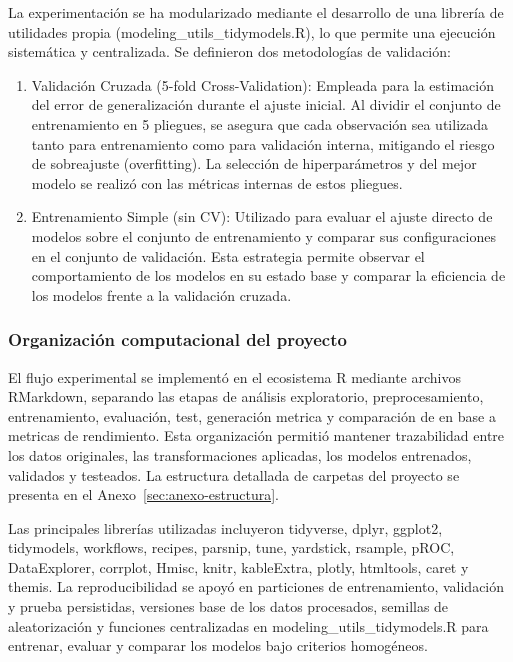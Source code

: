 La experimentación se ha modularizado mediante el desarrollo de una librería de
utilidades propia (modeling\_utils\_tidymodels.R), lo que permite una ejecución sistemática y centralizada. Se definieron dos metodologías de validación:

\begin{enumerate}
  \item Validación Cruzada (5-fold Cross-Validation): Empleada para la estimación
    del error de generalización durante el ajuste inicial. Al dividir el
    conjunto de entrenamiento en 5 pliegues, se asegura que cada observación sea
    utilizada tanto para entrenamiento como para validación interna, mitigando el
    riesgo de sobreajuste (overfitting). La selección de hiperparámetros y del
    mejor modelo se realizó con las métricas internas de estos pliegues.
  \item Entrenamiento Simple (sin CV): Utilizado para evaluar el ajuste directo de
    modelos sobre el conjunto de entrenamiento y comparar sus configuraciones en
    el conjunto de validación. Esta estrategia permite observar el comportamiento
    de los modelos en su estado base y comparar la eficiencia de los modelos
    frente a la validación cruzada.
\end{enumerate}

\subsubsection{Organización computacional del proyecto}

El flujo experimental se implementó en el ecosistema R mediante archivos
RMarkdown, separando las etapas de análisis exploratorio, preprocesamiento,
entrenamiento, evaluación, test, generación metrica y comparación de en base a metricas de rendimiento. Esta organización permitió
mantener trazabilidad entre los datos originales, las transformaciones aplicadas,
los modelos entrenados, validados y testeados. La estructura detallada de
carpetas del proyecto se presenta en el Anexo~\ref{sec:anexo-estructura}.

Las principales librerías utilizadas incluyeron tidyverse, dplyr, ggplot2,
tidymodels, workflows, recipes, parsnip, tune, yardstick, rsample, pROC,
DataExplorer, corrplot, Hmisc, knitr, kableExtra, plotly, htmltools, caret y themis. La
reproducibilidad se apoyó en particiones de entrenamiento, validación y prueba
persistidas, versiones base de los datos procesados, semillas de aleatorización
y funciones centralizadas en modeling\_utils\_tidymodels.R para entrenar,
evaluar y comparar los modelos bajo criterios homogéneos.

